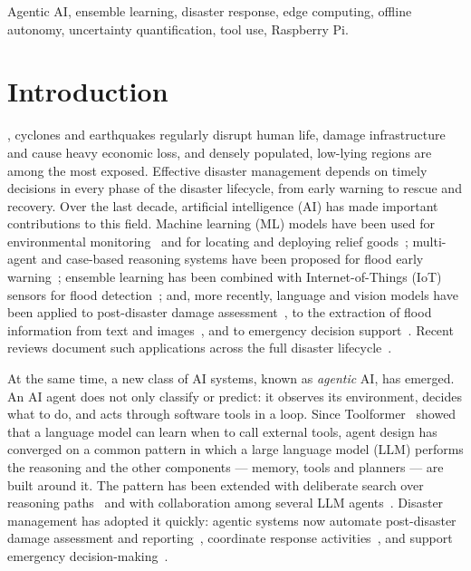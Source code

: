 \documentclass[journal]{IEEEtran}
\begin{document}
\begin{IEEEkeywords}
Agentic AI, ensemble learning, disaster response, edge computing, offline
autonomy, uncertainty quantification, tool use, Raspberry Pi.
\end{IEEEkeywords}

\section{Introduction}
, cyclones and earthquakes regularly disrupt human
life, damage infrastructure and cause heavy economic loss, and densely
populated, low-lying regions are among the most exposed. Effective disaster
management depends on timely decisions in every phase of the disaster
lifecycle, from early warning to rescue and recovery. Over the last decade,
artificial intelligence (AI) has made important contributions to this field.
Machine learning (ML) models have been used for environmental
monitoring~\cite{alotaibi2024artificial} and for locating and deploying relief
goods~\cite{farazmehr2023locating}; multi-agent and case-based reasoning
systems have been proposed for flood early warning~\cite{rashid2024integrating};
ensemble learning has been combined with Internet-of-Things (IoT) sensors for
flood detection~\cite{sen2026context}; and, more recently, language and vision
models have been applied to post-disaster damage
assessment~\cite{chen2026integration}, to the extraction of flood information
from text and images~\cite{wang2025fine,yang2026automated}, and to emergency
decision support~\cite{chen2024enhancing,wang2025towards}. Recent reviews
document such applications across the full disaster
lifecycle~\cite{xu2025large,saengtabtim2025harnessing}.

At the same time, a new class of AI systems, known as \emph{agentic} AI, has
emerged. An AI agent does not only classify or predict: it observes its
environment, decides what to do, and acts through software tools in a loop.
Since Toolformer~\cite{schick2023toolformer} showed that a language model can
learn when to call external tools, agent design has converged on a common
pattern in which a large language model (LLM) performs the reasoning and the
other components --- memory, tools and planners --- are built around it. The
pattern has been extended with deliberate search over reasoning
paths~\cite{yao2023tree} and with collaboration among several LLM
agents~\cite{zhang2024chain}. Disaster management has adopted it quickly:
agentic systems now automate post-disaster damage assessment and
reporting~\cite{chen2026integration}, coordinate response
activities~\cite{aththanayake2026resqconnect}, and support emergency
decision-making~\cite{wang2025towards,chen2024enhancing}.
\end{document}
